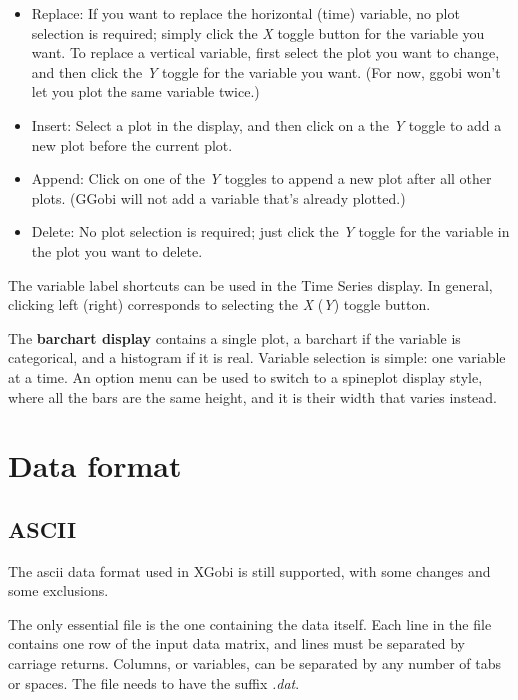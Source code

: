 \documentclass[11pt]{article}
\begin{document}
\begin{itemize}
\item Replace: If you want to replace the horizontal (time) variable,
  no plot selection is required; simply click the {\em X} toggle
  button for the variable you want.  To replace a vertical variable,
  first select the plot you want to change, and then click the {\em
  Y} toggle for the variable you want.  (For now, ggobi won't let you
  plot the same variable twice.) 
\item Insert:  Select a plot in the display, and then click
  on a the {\em Y} toggle to add a new plot before the current plot.
\item Append:  Click on one of the {\em Y} toggles to append
  a new plot after all other plots.  (GGobi will not add a variable
  that's already plotted.)
\item Delete: No plot selection is required; just click the
  {\em Y} toggle for the variable in the plot you want to delete.
\end{itemize}

The variable label shortcuts can be used in the Time Series display.
In general, clicking left (right) corresponds to selecting the {\em X}
({\em Y}) toggle button.


The {\bf barchart display} contains a single plot, a barchart if the
variable is categorical, and a histogram if it is real.   Variable
selection is simple: one variable at a time.  An option menu can be used
to switch to a spineplot display style, where all the bars are the same
height, and it is their width that varies instead.


\section{Data format}
\label{slbl:DataFormat}

\subsection {ASCII}
\label{slbl:ASCII}

The ascii data format used in XGobi is still
supported, with some changes and some exclusions.

The only essential file is the one containing the data itself.  Each
line in the file contains one row of the input data matrix, and lines
must be separated by carriage returns.  Columns, or variables, can be
separated by any number of tabs or spaces.  The file needs to have the
suffix {\em .dat}.
\end{document}
